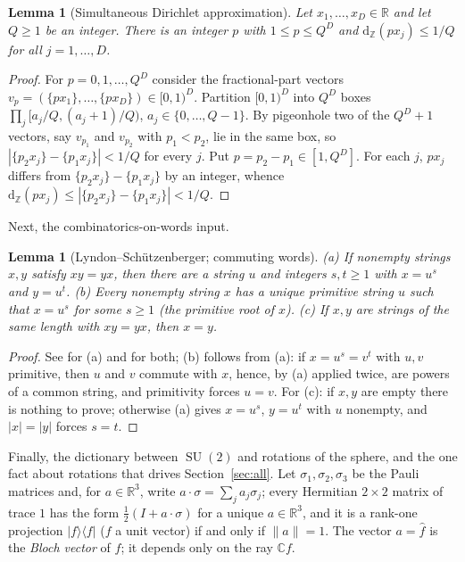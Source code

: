 \documentclass[11pt]{amsart}
\newtheorem{lemma}[theorem]{Lemma}
\theoremstyle{definition}
\theoremstyle{remark}
\newcommand{\R}{\mathbb{R}}
\newcommand{\C}{\mathbb{C}}
\newcommand{\Z}{\mathbb{Z}}
\newcommand{\dz}[1]{\mathrm{d}_{\Z}(#1)}
\DeclareMathOperator{\SU}{SU}
\begin{document}
\begin{lemma}[Simultaneous Dirichlet approximation]\label{lem:dirichlet}
Let $x_1,\dots,x_D\in\R$ and let $Q\ge1$ be an integer. There is an
integer $p$ with $1\le p\le Q^D$ and $\dz{px_j}\le1/Q$ for all
$j=1,\dots,D$.
\end{lemma}

\begin{proof}
For $p=0,1,\dots,Q^D$ consider the fractional-part vectors
$v_p=(\{px_1\},\dots,\{px_D\})\in[0,1)^D$. Partition $[0,1)^D$ into
$Q^D$ boxes $\prod_j[a_j/Q,(a_j+1)/Q)$, $a_j\in\{0,\dots,Q-1\}$. By
pigeonhole two of the $Q^D+1$ vectors, say $v_{p_1}$ and $v_{p_2}$
with $p_1<p_2$, lie in the same box, so
$|\{p_2x_j\}-\{p_1x_j\}|<1/Q$ for every $j$. Put $p=p_2-p_1\in
[1,Q^D]$. For each $j$, $px_j$ differs from
$\{p_2x_j\}-\{p_1x_j\}$ by an integer, whence
$\dz{px_j}\le|\{p_2x_j\}-\{p_1x_j\}|<1/Q$.
\end{proof}

Next, the combinatorics-on-words input.

\begin{lemma}[Lyndon--Sch\"utzenberger; commuting words]\label{lem:LS}
\emph{(a)} If nonempty strings $x,y$ satisfy $xy=yx$, then there are a
string $u$ and integers $s,t\ge1$ with $x=u^s$ and $y=u^t$.
\emph{(b)} Every nonempty string $x$ has a unique primitive string $u$
such that $x=u^s$ for some $s\ge1$ (the \emph{primitive root} of
$x$).
\emph{(c)} If $x,y$ are strings of the same length with $xy=yx$, then
$x=y$.
\end{lemma}

\begin{proof}
See \cite{LS62} for (a) and \cite[Section~1.3]{Lothaire} for both; (b)
follows from (a): if $x=u^s=v^t$ with $u,v$ primitive, then $u$ and
$v$ commute with $x$, hence, by (a) applied twice, are powers of a
common string, and primitivity forces $u=v$. For (c): if $x,y$ are
empty there is nothing to prove; otherwise (a) gives $x=u^s$, $y=u^t$
with $u$ nonempty, and $|x|=|y|$ forces $s=t$.
\end{proof}

Finally, the dictionary between $\SU(2)$ and rotations of the sphere,
and the one fact about rotations that drives Section~\ref{sec:all}.
Let $\sigma_1,\sigma_2,\sigma_3$ be the Pauli matrices and, for
$a\in\R^3$, write $a\cdot\sigma=\sum_ja_j\sigma_j$; every Hermitian
$2\times2$ matrix of trace $1$ has the form $\frac12(I+a\cdot\sigma)$
for a unique $a\in\R^3$, and it is a rank-one projection
$|f\rangle\langle f|$ ($f$ a unit vector) if and only if $\|a\|=1$. The
vector $a=\hat f$ is the \emph{Bloch vector} of $f$; it depends only
on the ray $\C f$.
\end{document}
